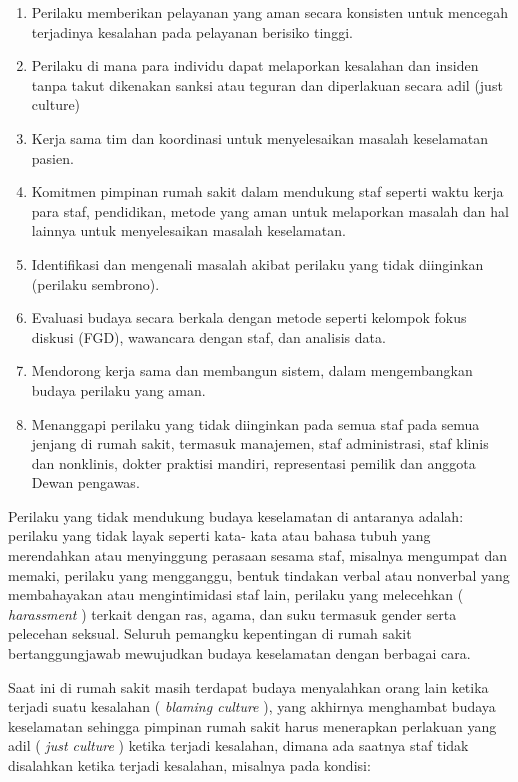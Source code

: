 \documentclass[
]{book}
\providecommand{\tightlist}{%
  \setlength{\itemsep}{0pt}\setlength{\parskip}{0pt}}
\begin{document}
\begin{enumerate}
\def\labelenumi{\alph{enumi}.}
\tightlist
\item
  Perilaku memberikan pelayanan yang aman secara konsisten untuk mencegah terjadinya kesalahan pada pelayanan berisiko tinggi.
\item
  Perilaku di mana para individu dapat melaporkan kesalahan dan insiden tanpa takut dikenakan sanksi atau teguran dan diperlakuan secara adil (just culture)
\item
  Kerja sama tim dan koordinasi untuk menyelesaikan masalah keselamatan pasien.
\item
  Komitmen pimpinan rumah sakit dalam mendukung staf seperti waktu kerja para staf, pendidikan, metode yang aman untuk melaporkan masalah dan hal lainnya untuk menyelesaikan masalah keselamatan.
\item
  Identifikasi dan mengenali masalah akibat perilaku yang tidak diinginkan (perilaku sembrono).
\item
  Evaluasi budaya secara berkala dengan metode seperti kelompok fokus diskusi (FGD), wawancara dengan staf, dan analisis data.
\item
  Mendorong kerja sama dan membangun sistem, dalam mengembangkan budaya perilaku yang aman.
\item
  Menanggapi perilaku yang tidak diinginkan pada semua staf pada semua jenjang di rumah sakit, termasuk manajemen, staf administrasi, staf klinis dan nonklinis, dokter praktisi mandiri, representasi pemilik dan anggota Dewan pengawas.
\end{enumerate}

Perilaku yang tidak mendukung budaya keselamatan di antaranya adalah: perilaku yang tidak layak seperti kata- kata atau bahasa tubuh yang merendahkan atau menyinggung perasaan sesama staf, misalnya mengumpat dan memaki, perilaku yang mengganggu, bentuk tindakan verbal atau nonverbal yang membahayakan atau mengintimidasi staf lain, perilaku yang melecehkan ( \emph{harassment} ) terkait dengan ras, agama, dan suku termasuk gender serta pelecehan seksual.
Seluruh pemangku kepentingan di rumah sakit bertanggungjawab mewujudkan budaya keselamatan dengan berbagai cara.

Saat ini di rumah sakit masih terdapat budaya menyalahkan orang lain ketika terjadi suatu kesalahan ( \emph{blaming culture} ), yang akhirnya menghambat budaya keselamatan sehingga pimpinan rumah sakit harus menerapkan perlakuan yang adil ( \emph{just culture} ) ketika terjadi kesalahan, dimana ada saatnya staf tidak disalahkan ketika terjadi kesalahan, misalnya pada kondisi:
\end{document}
